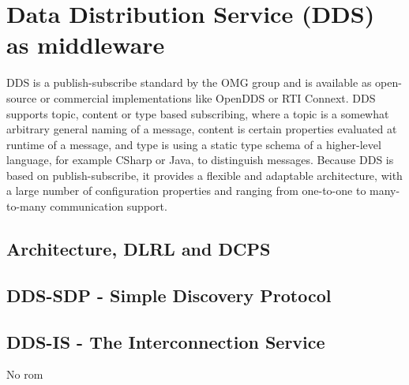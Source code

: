 \section{Data Distribution Service (DDS) as middleware}

DDS is a publish-subscribe standard by the OMG group and is available as open-source or commercial implementations like OpenDDS or RTI Connext. DDS supports topic, content or type based subscribing, where a topic is a somewhat arbitrary general naming of a message, content is certain properties evaluated at runtime of a message, and type is using a static type schema of a higher-level language, for example CSharp or Java, to distinguish messages. Because DDS is based on publish-subscribe, it provides a flexible and adaptable architecture, with a large number of configuration properties and ranging from one-to-one to many-to-many communication support.

\subsection{Architecture, DLRL and DCPS}



\subsection{DDS-SDP - Simple Discovery Protocol}

\subsection{DDS-IS - The Interconnection Service}
No rom